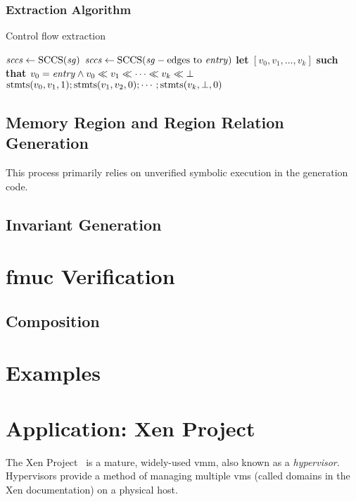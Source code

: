 \subsubsection{Extraction Algorithm}
\begin{algorithm}
  \caption{Control flow extraction}\label{algo:cf}
  \begin{algorithmic}[1]
      \State $\mathit{sccs}\gets\operatorname{SCCS}(\mathit{sg})$
        \State $\mathit{sccs}\gets\operatorname{SCCS}(\mathit{sg}-\text{edges to }\mathit{entry})$
      \EndIf
      \State \textbf{let} $[v_0,v_1,\dotsc,v_k]$ \textbf{such that} $v_0=\mathit{entry}\wedge v_0\ll v_1\ll\dotsb\ll v_k\ll\bot$
      \State\Return $\operatorname{stmts}(v_0,v_1,1);\operatorname{stmts}(v_1,v_2,0);\dotsb;\operatorname{stmts}(v_k,\bot,0)$
    \EndFunction
  \end{algorithmic}
\end{algorithm}


\subsection{Memory Region and Region Relation Generation}\label{sse:mem_reg}
This process primarily relies on unverified symbolic execution in the generation code.


\subsection{Invariant Generation}\label{sse:inv_gen}

\section{\acs*{fmuc} Verification}\label{se:fmuc_ver}
\subsection{Composition}\label{sse:fmuc_comp}

\section{Examples}\label{se:syntax_example}

\section{Application: Xen Project}\label{se:xen}
The Xen Project~\citep{chisnall2008definitive}
is a mature, widely-used \ac{vmm}, also known as a \emph{hypervisor}.
Hypervisors provide a method of managing multiple
\acp{vm} (called domains in the Xen documentation) on a physical host.

